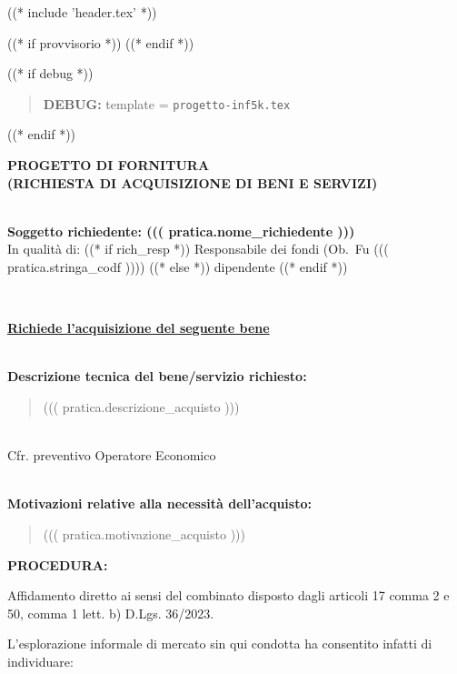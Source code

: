 
((* include 'header.tex' *))

((* if provvisorio *))
((* endif *))


\topaddr

((* if debug *))
\begin{quotation}
	\textbf{DEBUG:} template = \texttt{progetto-inf5k.tex}
\end{quotation}
((* endif *))

\begin{center}
\textbf{PROGETTO DI FORNITURA \\ (RICHIESTA DI ACQUISIZIONE DI BENI E SERVIZI)}
\end{center}

~\\
\textbf{Soggetto richiedente: ((( pratica.nome_richiedente )))} \\

In qualità di:          %
((* if rich_resp *)) Responsabile dei fondi (Ob.~Fu ((( pratica.stringa_codf ))))
((* else *)) dipendente
((* endif *))

~\\
\begin{center}
\textbf{\underline{Richiede l'acquisizione del seguente bene}}
\end{center}

~\\
\textbf{Descrizione tecnica del bene/servizio richiesto:}
\begin{quote}
((( pratica.descrizione_acquisto )))
\end{quote}

~\\
Cfr. preventivo Operatore Economico 

~\\
\textbf{Motivazioni relative alla necessità dell’acquisto: }
\begin{quote}
((( pratica.motivazione_acquisto )))
\end{quote}


\textbf{PROCEDURA: } %

Affidamento diretto ai sensi del combinato disposto dagli articoli 17 comma 2 e 50, comma 1 lett. b) D.Lgs. 36/2023.

L’esplorazione informale di mercato sin qui condotta ha consentito infatti di individuare:

